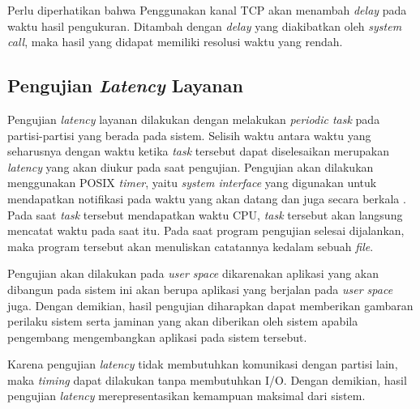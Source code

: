 Perlu diperhatikan bahwa Penggunakan kanal TCP akan menambah \textit{delay} pada waktu hasil
pengukuran. Ditambah dengan \textit{delay} yang diakibatkan oleh \textit{system call}, maka
hasil yang didapat memiliki resolusi waktu yang rendah.

\subsection{Pengujian \textit{Latency} Layanan}
\label{section:pengujian_latency}

Pengujian \textit{latency} layanan dilakukan dengan melakukan \textit{periodic task} pada
partisi-partisi yang berada pada sistem. Selisih waktu antara waktu yang seharusnya dengan waktu
ketika \textit{task} tersebut dapat diselesaikan merupakan \textit{latency} yang akan diukur
pada saat pengujian. Pengujian akan dilakukan menggunakan POSIX \textit{timer}, yaitu
\textit{system interface} yang digunakan untuk mendapatkan notifikasi pada waktu yang akan
datang dan juga secara berkala \citep{POSIX}. Pada saat \textit{task} tersebut mendapatkan waktu
CPU, \textit{task} tersebut akan langsung mencatat waktu pada saat itu. Pada saat program
pengujian selesai dijalankan, maka program tersebut akan menuliskan catatannya kedalam sebuah
\textit{file}.

Pengujian akan dilakukan pada \textit{user space} dikarenakan aplikasi yang akan dibangun pada
sistem ini akan berupa aplikasi yang berjalan pada \textit{user space} juga. Dengan demikian,
hasil pengujian diharapkan dapat memberikan gambaran perilaku sistem serta jaminan yang akan
diberikan oleh sistem apabila pengembang mengembangkan aplikasi pada sistem tersebut.

Karena pengujian \textit{latency} tidak membutuhkan komunikasi dengan partisi lain, maka
\textit{timing} dapat dilakukan tanpa membutuhkan I/O. Dengan demikian, hasil pengujian
\textit{latency} merepresentasikan kemampuan maksimal dari sistem.


